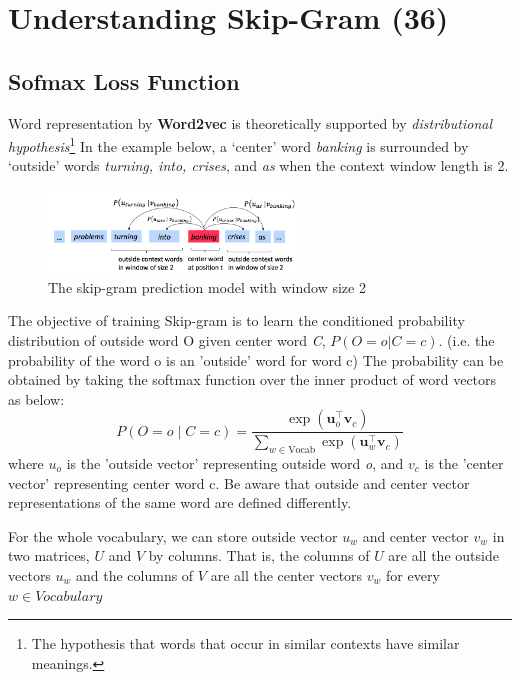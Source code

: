 \documentclass{assignment format}
\begin{document}

\section{Understanding Skip-Gram (36)}

\subsection{Sofmax Loss Function}
Word representation by \textbf{Word2vec} is theoretically supported by  \textit{distributional hypothesis}\footnote{The hypothesis that words that occur in similar contexts have similar meanings.} In the example below, a `center' word \textit{banking} is surrounded by `outside' words \textit{turning, into, crises}, and \textit{as} when the context window length is 2.

\begin{figure}[h]
    \centering
    \includegraphics[width=0.6\textwidth]{word2vec.png}
    \caption{The skip-gram prediction model with window size 2}
    \label{fig:word2vec}
\end{figure}
The objective of training Skip-gram is to learn the conditioned probability distribution of outside word {O} given center word \textit{C}, $P(O=o|C=c)$. (i.e. the probability of the word o is an 'outside' word for word c)
The probability can be obtained by taking the softmax function over the inner product of word vectors as below:
\begin{equation}
 P(O=o \mid C=c) = \frac{\exp(\bm u_{o}^\top \bm v_c)}{\sum_{w \in \text{Vocab}} \exp(\bm u_{w}^\top \bm v_c)}
 \label{word2vec_condprob}
\end{equation}
where $u_o$ is the 'outside vector' representing outside word \textit{o}, and $v_c$ is the 'center vector' representing center word c. Be aware that outside and center vector representations of the same word are defined differently.

For the whole vocabulary, we can store outside vector $u_w$ and center vector $v_w$ in two matrices, $U$ and $V$ by columns. That is, the columns of $U$ are all the outside vectors $u_w$ and the columns of $V$ are all the center vectors $v_w$ for every $w \in Vocabulary$
\end{document}
